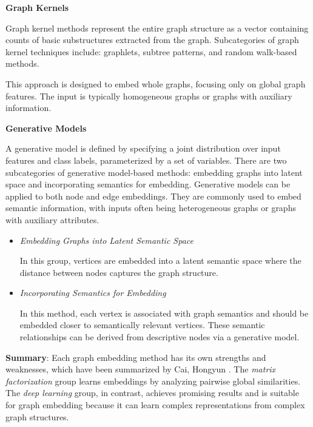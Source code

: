 \textbf{Graph Kernels}

Graph kernel methods represent the entire graph structure as a vector containing counts of basic substructures extracted from the graph. Subcategories of graph kernel techniques include: graphlets, subtree patterns, and random walk-based methods.

This approach is designed to embed whole graphs, focusing only on global graph features. The input is typically homogeneous graphs or graphs with auxiliary information.

\textbf{Generative Models}

A generative model is defined by specifying a joint distribution over input features and class labels, parameterized by a set of variables. There are two subcategories of generative model-based methods: embedding graphs into latent space and incorporating semantics for embedding. Generative models can be applied to both node and edge embeddings. They are commonly used to embed semantic information, with inputs often being heterogeneous graphs or graphs with auxiliary attributes.

\begin{itemize}
	\item \textit{Embedding Graphs into Latent Semantic Space}
	
	In this group, vertices are embedded into a latent semantic space where the distance between nodes captures the graph structure.
	
	\item \textit{Incorporating Semantics for Embedding}
	
	In this method, each vertex is associated with graph semantics and should be embedded closer to semantically relevant vertices. These semantic relationships can be derived from descriptive nodes via a generative model.
\end{itemize}

\textbf{Summary}: Each graph embedding method has its own strengths and weaknesses, which have been summarized by Cai, Hongyun \cite{cai2018comprehensive}. The \textit{matrix factorization} group learns embeddings by analyzing pairwise global similarities. The \textit{deep learning} group, in contrast, achieves promising results and is suitable for graph embedding because it can learn complex representations from complex graph structures.

